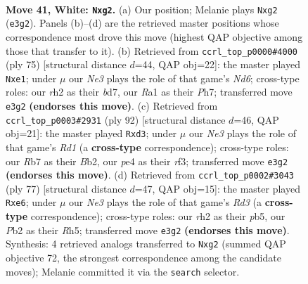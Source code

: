 \documentclass[11pt]{article}
\begin{document}
\clearpage

\begin{figure}[p]\centering
\begin{subfigure}{0.46\textwidth}\centering
\resizebox{\linewidth}{!}{%
\newchessgame
\chessboard[
  setfen={8/pR6/8/2p2p1P/4p3/3kN3/1P4rr/R2K4 w - - 3 41},
  showmover=false,
  pgfstyle=straightmove, color=movearrow, markmove={e3-g2}
]}
\caption{}
\end{subfigure}\hfill
\begin{subfigure}{0.46\textwidth}\centering
\resizebox{\linewidth}{!}{%
\newchessgame
\chessboard[
  setfen={5rk1/3B3p/8/3P4/p5P1/P2n2K1/1r5P/4RR2 b - - 6 38},
  showmover=false,
  pgfstyle=straightmove, color=movearrow, markmove={d3-e1}
]}
\caption{}
\end{subfigure}
\\[4pt]
\begin{subfigure}{0.46\textwidth}\centering
\resizebox{\linewidth}{!}{%
\newchessgame
\chessboard[
  setfen={6k1/7p/4n1p1/4p3/2N5/P2r1r2/1B4R1/3R2K1 w - - 2 47},
  showmover=false,
  pgfstyle=straightmove, color=movearrow, markmove={d1-d3}
]}
\caption{}
\end{subfigure}\hfill
\begin{subfigure}{0.46\textwidth}\centering
\resizebox{\linewidth}{!}{%
\newchessgame
\chessboard[
  setfen={8/8/1k1rRp2/1Pp2P1r/p7/8/PPK2R2/8 b - - 2 39},
  showmover=false,
  pgfstyle=straightmove, color=movearrow, markmove={d6-e6}
]}
\caption{}
\end{subfigure}
\caption{\textbf{Move 41, White: \texttt{Nxg2}.} (a) Our position; Melanie plays \texttt{Nxg2} (\texttt{e3g2}). Panels (b)--(d) are the retrieved master positions whose correspondence most drove this move (highest QAP objective among those that transfer to it). (b) Retrieved from \texttt{ccrl\_top\_p0000\#4000} (ply 75) [structural distance $d$=44, QAP obj=22]: the master played \texttt{Nxe1}; under $\mu$ our \emph{Ne3} plays the role of that game's \emph{Nd6}; cross-type roles: our \emph{r}h2 as their \emph{b}d7, our \emph{R}a1 as their \emph{P}h7; transferred move \texttt{e3g2} \textbf{(endorses this move)}. (c) Retrieved from \texttt{ccrl\_top\_p0003\#2931} (ply 92) [structural distance $d$=46, QAP obj=21]: the master played \texttt{Rxd3}; under $\mu$ our \emph{Ne3} plays the role of that game's \emph{Rd1} (a \textbf{cross-type} correspondence); cross-type roles: our \emph{R}b7 as their \emph{B}b2, our \emph{p}e4 as their \emph{r}f3; transferred move \texttt{e3g2} \textbf{(endorses this move)}. (d) Retrieved from \texttt{ccrl\_top\_p0002\#3043} (ply 77) [structural distance $d$=47, QAP obj=15]: the master played \texttt{Rxe6}; under $\mu$ our \emph{Ne3} plays the role of that game's \emph{Rd3} (a \textbf{cross-type} correspondence); cross-type roles: our \emph{r}h2 as their \emph{p}b5, our \emph{P}b2 as their \emph{R}h5; transferred move \texttt{e3g2} \textbf{(endorses this move)}. Synthesis: 4 retrieved analogs transferred to \texttt{Nxg2} (summed QAP objective 72, the strongest correspondence among the candidate moves); Melanie committed it via the \texttt{search} selector.}
\label{fig:thought-m80}
\end{figure}
\end{document}
